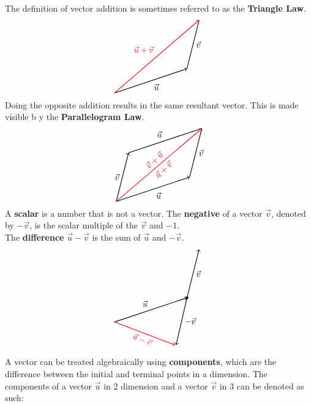 \documentclass[../Calculus_\Roman{3}]{subfiles}
\begin{document}
				The definition of vector addition is sometimes referred to as the \textbf{Triangle Law}.
				\[\begin{tikzpicture}
					\draw[thick, ->] (0, 0) -- node[anchor = north west]{$\vec{u}$} ++ (3, 1);
					\draw[thick] (3, 1) -- node[anchor = west]{$\vec{v}$} ++ (0.5, 2);
					\draw[thick, ->, color = red] (0, 0) -- node[anchor = south east]{$\vec{u} + \vec{v}$} ++ (3.5, 3); 
				\end{tikzpicture}\]
				Doing the opposite addition results in the same resultant vector. This is made visible b y the \textbf{Parallelogram Law}.
				\[\begin{tikzpicture}
					\draw[thick, ->] (0, 0) -- node[anchor = north west]{$\vec{u}$} ++ (3, 1);
					\draw[thick] (3, 1) -- node[anchor = west]{$\vec{v}$} ++ (0.5, 2);
					\draw[thick, ->] (0, 0) -- node[anchor = east]{$\vec{v}$} (0.5, 2);
					\draw[thick] (0.5, 2) -- node[anchor = south east]{$\vec{u}$} ++ (3, 1);
					\draw[thick, ->, color = red] (0, 0) -- node[anchor = south, rotate = 43]{$\vec{v} + \vec{u}$} node[anchor = north, rotate = 43]{$\vec{u} + \vec{v}$} ++ (3.5, 3);
				\end{tikzpicture}\]
				A \textbf{scalar} is a number that is not a vector.
				The \textbf{negative} of a vector $\vec{v}$, denoted by $-\vec{v}$, is the scalar multiple of the $\vec{v}$ and $-1$. \\
				The \textbf{difference} $\vec{u} - \vec{v}$ is the sum of $\vec{u}$ and $-\vec{v}$.
				\[\begin{tikzpicture}
					\draw[thick, ->] (0, 0) -- node[anchor = south east]{$\vec{u}$} ++ (3, 1);
					\filldraw (3, 1) circle (0.5mm);
					\draw[thick, ->] (3, 1) -- node[anchor = west]{$\vec{v}$} ++ (0.5, 2);
					\draw[thick, ->] (3, 1) -- node[anchor = west]{$-\vec{v}$} ++(-0.45, -1.95);
					\draw[thick, ->, color = red] (0, 0) -- node[anchor = north, rotate = -22]{$\vec{u} - \vec{v}$} (2.5, -0.95);
				\end{tikzpicture}\]
				A vector can be treated algebraically using \textbf{components}, which are the difference between the initial and terminal points in a dimension. The components of a vector $\vec{u}$ in 2 dimension and a vector $\vec{v}$ in 3 can be denoted as such:
\end{document}
